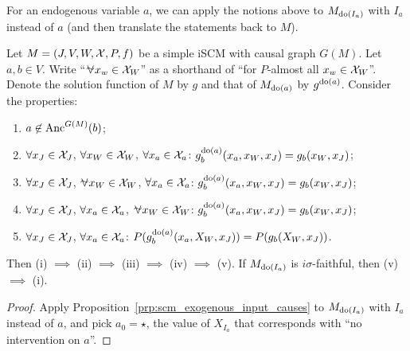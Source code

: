 For an endogenous variable $a$, we can apply the notions above to $M_{\operatorname{do}(I_a)}$ with $I_a$ instead of $a$ (and then translate the statements back to $M$).
\begin{Cor}\label{cor:scm_endogenous_causes}
  Let $M = \left ( J, V, W, \mathcal{X}, P, f \right )$ be a simple iSCM with causal graph $G(M)$.
  Let $a,b \in V$. 
  Write ``$\foralmostall x_w \in \CX_W$'' as a shorthand of ``for $P$-almost all $x_w \in \mathcal{X}_W$''.
  Denote the solution function of $M$ by $g$ and that of $M_{\operatorname{do}(a)}$ by $g^{\operatorname{do}(a)}$.
  Consider the properties:
  \begin{enumerate}[label=(\roman*)]
    \item[(i)]   $a \not\in \mathrm{Anc}^{G(M)}(b)$;
    \item[(ii)]  $\forall x_J \in \mathcal{X}_J$, $\forall x_W \in \mathcal{X}_W$, $\forall x_a \in \mathcal{X}_a$:        $g_b^{\operatorname{do}(a)}(x_a,x_W,x_J)    = g_b(x_W,x_J)$;
    \item[(iii)]  $\forall x_J \in \mathcal{X}_J$, $\foralmostall x_W \in \CX_W$, $\forall x_a \in \mathcal{X}_a$: $g_b^{\operatorname{do}(a)}(x_a,x_W,x_J)    = g_b(x_W,x_J)$;
    \item[(iv)]   $\forall x_J \in \mathcal{X}_J$, $\forall x_a \in \mathcal{X}_a$, $\foralmostall x_W \in \CX_W$: $g_b^{\operatorname{do}(a)}(x_a,x_W,x_J)    = g_b(x_W,x_J)$;
    \item[(v)]  $\forall x_J \in \mathcal{X}_J$, $\forall x_a \in \mathcal{X}_a$:                                $P(g_b^{\operatorname{do}(a)}(x_a,X_W,x_J)) = P(g_b(X_W,x_J))$.
  \end{enumerate}
  Then (i) $\implies$ (ii) $\implies$ (iii) $\implies$ (iv) $\implies$ (v).
  If $M_{\operatorname{do}(I_a)}$ is $i\sigma$-faithful, then (v) $\implies$ (i).
\end{Cor}
\begin{proof}
  Apply Proposition~\ref{prp:scm_exogenous_input_causes} to $M_{\operatorname{do}(I_a)}$ with $I_a$ instead of $a$,
  and pick $a_0 = \star$, the value of $X_{I_a}$ that corresponds with ``no intervention on $a$''.
\end{proof}

